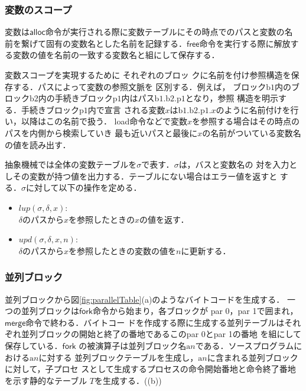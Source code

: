 \documentclass[submit,PRO]{ipsj}
\newcommand{\bcode}[1]{$\mathsf{#1}$}
\newcommand{\blabel}[1]{\mathrm{b}#1}
\newcommand{\plabel}[1]{\mathrm{p}#1}
\newcommand{\alabel}[1]{\mathrm{a}#1}
\begin{document}
\subsubsection{変数のスコープ}

変数は\bcode{alloc}命令が実行される際に変数テーブルにその時点でのパスと変数の名
前を繋げて固有の変数名とした名前を記録する．\bcode{free}命令を実行する際に解放す
る変数の値を名前の一致する変数名と組にして保存する．

変数スコープを実現するために
それぞれのブロッ
クに名前を付け参照構造を保存する．パスによって変数の参照文脈を
区別する．例えば，
ブロック$\blabel{1}$内のブロック$\blabel{2}$内の手続きブロック$\plabel{1}$内はパス$\blabel{1}.\blabel{2}.\plabel{1}$となり，参照
構造を明示する．手続きブロック$\plabel{1}$内で宣言
される変数$x$は$\blabel{1}.\blabel{2}.\plabel{1}.x$のように名前付けを行い，以降はこの名前で扱う．
load命令などで変数$x$を参照する場合はその時点のパスを内側から検索していき
最も近いパスと最後に$x$の名前がついている変数名の値を読み出す．

抽象機械では全体の変数テーブルを$\sigma$で表す．$\sigma$は，バスと変数名の
対を入力としその変数が持つ値を出力する．テーブルにない場合はエラー値を返すと
する．$\sigma$に対して以下の操作を定める．
\begin{itemize}
 \item $lup(\sigma,\delta,x)$:\\
$\delta$のパスから$x$を参照したときの$x$の値を返す．


 \item $upd(\sigma,\delta,x,n)$:\\
$\delta$のパスから$x$を参照したときの変数の値を$n$に更新する．
\end{itemize}

\subsubsection{並列ブロック}

並列ブロックから図\ref{fig:parallelTable}(a)のようなバイトコードを生成する．
%
一つの並列ブロックは\bcode{fork}命令から始まり，各ブロックが
{\sf par 0}，{\sf par 1}で囲まれ，\bcode{merge}命令で終わる．バイトコー
ドを作成する際に生成する並列テーブルはそれぞれ並列ブロックの開始と終了の番地であるこの{\sf par 0}と{\sf par 1}の番地
を組にして保存している．\bcode{fork}
の被演算子は並列ブロック名$\alabel{n}$である．ソースプログラムにおける$\alabel{n}$に対する
並列ブロックテーブルを生成し，$\alabel{n}$に含まれる並列ブロックに対して，子プロセ
スとして生成するプロセスの命令開始番地と命令終了番地を示す静的なテーブル
$T$を生成する．((b))
\end{document}
